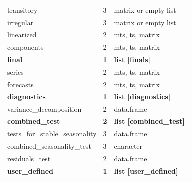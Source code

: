 \documentclass[article]{jss}
\begin{document}
\begin{longtable}[t]{lll}
\addlinespace
\hspace{3em}transitory & 3 & matrix or empty list\\
\hspace{3em}irregular & 3 & matrix or empty list\\
\hspace{2em}linearized & 2 & mts, ts, matrix\\
\hspace{2em}components & 2 & mts, ts, matrix\\
\textbf{\hspace{1em}final} & \textbf{1} & \textbf{list [finals]}\\
\addlinespace
\hspace{2em}series & 2 & mts, ts, matrix\\
\hspace{2em}forecasts & 2 & mts, ts, matrix\\
\textbf{\hspace{1em}diagnostics} & \textbf{1} & \textbf{list [diagnostics]}\\
\hspace{2em}variance\_decomposition & 2 & data.frame\\
\textbf{\hspace{2em}combined\_test} & \textbf{2} & \textbf{list [combined\_test]}\\
\addlinespace
\hspace{3em}tests\_for\_stable\_seasonality & 3 & data.frame\\
\hspace{3em}combined\_seasonality\_test & 3 & character\\
\hspace{2em}residuals\_test & 2 & data.frame\\
\textbf{\hspace{1em}user\_defined} & \textbf{1} & \textbf{list [user\_defined]}\\
\bottomrule
\end{longtable}
\end{document}
